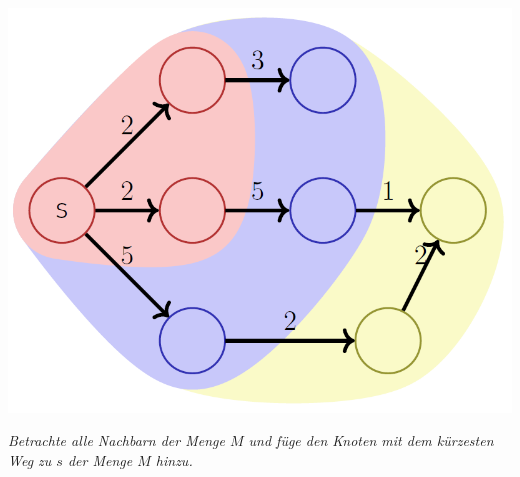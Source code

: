 \begin{sectionbox}
\begin{center}
    \includegraphics[width = 0.35\columnwidth]{../img/DijkstraSym.png}\par
\end{center}
\textit{Betrachte alle Nachbarn der Menge $M$ und füge den Knoten mit dem kürzesten Weg zu $s$ der Menge $M$ hinzu.}\par
\end{sectionbox}

